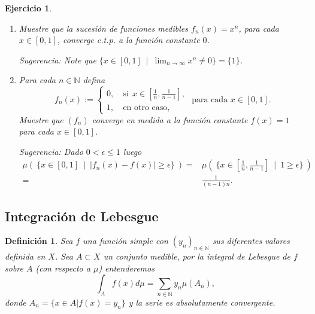 \documentclass[twoside,12pt,a4 paper,openright]{book}
\newtheorem{ejer}[claim]{Ejercicio}
\newtheorem{defi}[claim]{Definici\'on}
\begin{document}
\begin{ejer}
\begin{enumerate}
\item Muestre que la sucesi\'on de funciones medibles  $f_n(x)= x^n$, para cada $x\in [0,1]$, converge c.t.p. a la funci\'on constante $0$.

Sugerencia: Note que $\{ x\in [0,1] \ \mid  \  \lim_{n\to \infty} x^n \neq 0 \}=\{1\}$.


\item Para cada $n\in \mathbb N$ defina
$$
f_n(x):= \left\{  \begin{array}{ll} 0, & \   \textrm{si} \ \ x\in [\frac{1}{n }, \frac{1}{n-1}] , \\
  1 , & \   \textrm{en otro caso,}        \end{array}  \right. \textrm{ para cada $x\in [0,1]$.}
$$ 
Muestre que $(f_n)$ converge en medida a la funci\'on constante $f(x)=1$ para cada $x\in [0,1]$.

Sugerencia: Dado $0<\epsilon\leq 1$  luego
\begin{align*}
\mu( \ \{   x\in [0,1] \ \mid \  |f_n (x)- f(x)| \geq \epsilon \} \   ) = & \mu( \  \{ x\in [\frac{1}{n}, \frac{1}{n-1}]  \ \mid \  1  \geq \epsilon \} \ )  \\
                                                                                       = & \frac{1}{(n-1)n}      .
                                                                                \end{align*}
                                                                                 
\end{enumerate}
\end{ejer}









\subsection{Integraci\'on de Lebesgue}






\begin{defi}
    Sea $f$ una funci\'on simple con $(y_n)_{n\in \mathbb{N}}$ sus diferentes valores definida en $X$. Sea $A\subset X$ un conjunto medible, por la integral de Lebesgue de $f$ sobre $A$ (con respecto a $\mu$) entenderemos 
    $$\int_A f(x)d\mu = \sum_{n\in \mathbb{N}}y_n \mu(A_n),$$
donde $A_n = \{x\in A | f(x) = y_n\}$ y la serie es absolutamente convergente. 
\end{defi}
\end{document}
